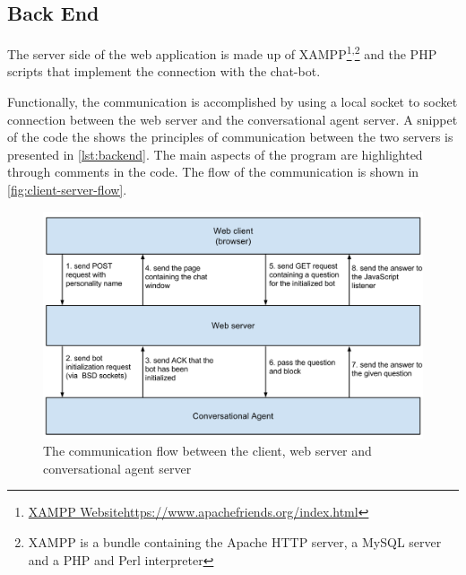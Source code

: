 \subsection{Back End}
\label{sub-sec:impl-wa-back-end}

The server side of the web application is made up of XAMPP\footnote{\href{https://www.apachefriends.org/index.html}{XAMPP Website}\url{https://www.apachefriends.org/index.html}}\textsuperscript{,}\footnote{XAMPP is a bundle containing the Apache HTTP server, a MySQL server and a PHP and Perl interpreter} and the PHP scripts that implement the connection with the chat-bot.

Functionally, the communication is accomplished by using a local socket to socket connection between the web server and the conversational agent server. A snippet of the code the shows the principles of communication between the two servers is presented in \autoref{lst:backend}. The main aspects of the program are highlighted through comments in the code. The flow of the communication is shown in \autoref{fig:client-server-flow}.



\begin{figure}[htb]
  \centering
  \captionsetup{justification=centering}
  \includegraphics[width=\textwidth]{src/img/client-server-flow.png}
  \caption[Order of requests between client and servers]{The communication flow between the client, web server and conversational agent server}
  \label{fig:client-server-flow}
\end{figure}



